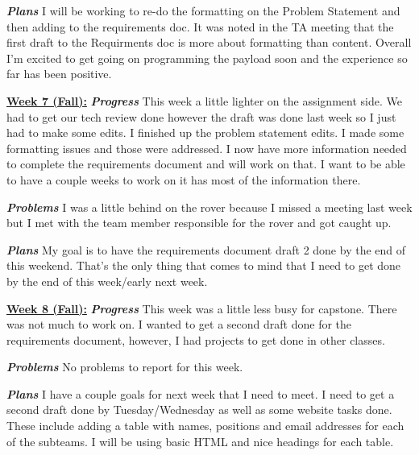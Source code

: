 \documentclass[onecolumn, draftclsnofoot, 10pt, compsoc]{IEEEtran}
\begin{document}
\textbf{\textit{{Plans}}}
\newline I will be working to re-do the formatting on the Problem Statement and then adding to the requirements doc. It was noted in the TA meeting that the first draft to the Requirments doc is more about formatting than content. Overall I'm excited to get going on programming the payload soon and the experience so far has been positive. \newline 

\underline{\textbf{Week 7 (Fall):}}
\newline\textbf{\textit{{Progress}}}
\newline This week a little lighter on the assignment side. We had to get our tech review done however the draft was done last week so I just had to make some edits. I finished up the problem statement edits. I made some formatting issues and those were addressed.  I now have more information needed to complete the requirements document and will work on that. I want to be able to have a couple weeks to work on it has most of the information there. \newline 

\textbf{\textit{{Problems}}}
\newline  I was a little behind on the rover because I missed a meeting last week but I met with the team member responsible for the rover and got caught up. \newline 

\textbf{\textit{{Plans}}}
\newline My goal is to have the requirements document draft 2 done by the end of this weekend. That's the only thing that comes to mind that I need to get done by the end of this week/early next week. \newline 

\underline{\textbf{Week 8 (Fall):}}
\newline\textbf{\textit{{Progress}}}
\newline This week was a little less busy for capstone. There was not much to work on. I wanted to get a second draft done for the requirements document, however, I had projects to get done in other classes.  \newline 

\textbf{\textit{{Problems}}}
\newline No problems to report for this week. \newline

\textbf{\textit{{Plans}}}
\newline I have a couple goals for next week that I need to meet. I need to get a second draft done by Tuesday/Wednesday as well as some website tasks done. These include adding a table with names, positions and email addresses for each of the subteams. I will be using basic HTML and nice headings for each table. \newline 
\end{document}
